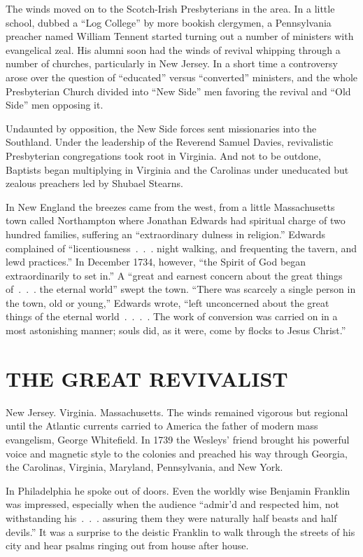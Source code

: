 The winds moved on to the Scotch-Irish Presbyterians in the area. In a little school, dubbed a “Log
College” by more bookish clergymen, a Pennsylvania preacher named William Tennent started turning
out a number of ministers with evangelical zeal. His alumni soon had the winds of revival whipping
through a number of churches, particularly in New Jersey. In a short time a controversy arose over
the question of “educated” versus “converted” ministers, and the whole Presbyterian Church divided
into “New Side” men favoring the revival and “Old Side” men opposing it.

Undaunted by opposition, the New Side forces sent missionaries into the Southland. Under the
leadership of the Reverend Samuel Davies, revivalistic Presbyterian congregations took root in
Virginia. And not to be outdone, Baptists began multiplying in Virginia and the Carolinas under
uneducated but zealous preachers led by Shubael Stearns.

In New England the breezes came from the west, from a little Massachusetts town called Northampton
where Jonathan Edwards had spiritual charge of two hundred families, suffering an “extraordinary
dulness in religion.” Edwards complained of “licentiousness~.~.~. night walking, and frequenting the
tavern, and lewd practices.” In December 1734, however, “the Spirit of God began extraordinarily to
set in.” A “great and earnest concern about the great things of~.~.~. the eternal world” swept the
town. “There was scarcely a single person in the town, old or young,” Edwards wrote, “left
unconcerned about the great things of the eternal world~.~.~.~. The work of conversion was carried
on in a most astonishing manner; souls did, as it were, come by flocks to Jesus Christ.”

\section{THE GREAT REVIVALIST}

New Jersey. Virginia. Massachusetts. The winds remained vigorous but regional until the Atlantic
currents carried to America the father of modern mass evangelism, George Whitefield. In 1739 the
Wesleys’ friend brought his powerful voice and magnetic style to the colonies and preached his way
through Georgia, the Carolinas, Virginia, Maryland, Pennsylvania, and New York.

In Philadelphia he spoke out of doors. Even the worldly wise Benjamin Franklin was impressed,
especially when the audience “admir’d and respected him, not withstanding his~.~.~. assuring them
they were naturally half beasts and half devils.” It was a surprise to the deistic Franklin to walk
through the streets of his city and hear psalms ringing out from house after house.

